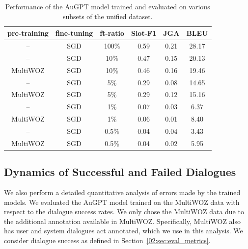 \begin{table}[tp]
    \centering \small
    \begin{tabular}{cccccc}
      \toprule
       pre-training & fine-tuning & ft-ratio & \textbf{Slot-F1} & \textbf{JGA} & \textbf{BLEU} \\
        \midrule
       -- & SGD & 100\% & 0.59 & 0.21 & 28.17 \\
       -- & SGD & 10\% & 0.47 & 0.15 & 20.13 \\
       MultiWOZ & SGD & 10\% & 0.46 & 0.16 & 19.46 \\
       -- & SGD & 5\% & 0.29 & 0.08 & 14.65 \\
       MultiWOZ & SGD & 5\% & 0.29 & 0.12 & 15.16 \\
       -- & SGD & 1\% & 0.07 & 0.03 & 6.37\\
       MultiWOZ & SGD & 1\% & 0.06 & 0.01 & 8.40 \\
       -- & SGD & 0.5\% & 0.04 & 0.04 & 3.43 \\
       MultiWOZ & SGD & 0.5\% & 0.04 & 0.02 & 5.95 \\
       \midrule
      \bottomrule
  \end{tabular}
  \caption{Performance of the AuGPT model trained and evaluated on various subsets of the unified dataset.}
  \label{tab:exp-results-seed}
\end{table}


\subsection{Dynamics of Successful and Failed Dialogues}
We also perform a detailed quantitative analysis of errors made by the trained models.
We evaluated the AuGPT model trained on the MultiWOZ data with respect to the dialogue success rates.
We only chose the MultiWOZ data due to the additional annotation available in MultiWOZ.
Specifically, MultiWOZ also has user and system dialogues act annotated, which we use in this analysis.
We consider dialogue success as defined in Section~\ref{02:sec:eval_metrics}.

